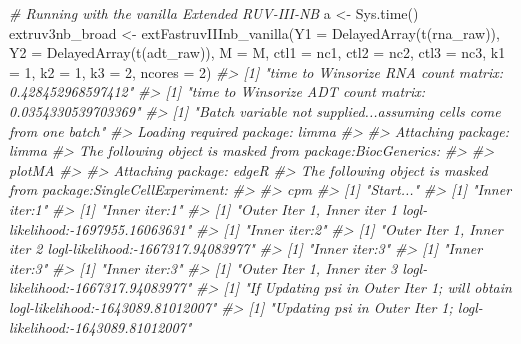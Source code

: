 \documentclass[]{article}
\newcommand{\hlnum}[1]{\textcolor[rgb]{0.816,0.125,0.439}{#1}}%
\newcommand{\hlcom}[1]{\textcolor[rgb]{0.502,0.502,0.502}{\textit{#1}}}%
\newcommand{\hlstd}[1]{\textcolor[rgb]{0.251,0.251,0.251}{#1}}%
\newenvironment{Shaded}{\begin{myshaded}}{\end{myshaded}}
\newcommand{\DecValTok}[1]{\hlnum{#1}}
\newcommand{\CommentTok}[1]{\hlcom{#1}}
\newcommand{\OtherTok}[1]{{#1}}
\newcommand{\FunctionTok}[1]{\hlstd{#1}}
\newcommand{\AttributeTok}[1]{{#1}}
\newcommand{\NormalTok}[1]{\hlstd{#1}}
\begin{document}
\begin{Shaded}
\begin{Highlighting}[]
\CommentTok{\# Running with the vanilla Extended RUV{-}III{-}NB}
\NormalTok{a }\OtherTok{\textless{}{-}} \FunctionTok{Sys.time}\NormalTok{()}
\NormalTok{extruv3nb\_broad }\OtherTok{\textless{}{-}} \FunctionTok{extFastruvIIInb\_vanilla}\NormalTok{(}\AttributeTok{Y1 =} \FunctionTok{DelayedArray}\NormalTok{(}\FunctionTok{t}\NormalTok{(rna\_raw)),}
    \AttributeTok{Y2 =} \FunctionTok{DelayedArray}\NormalTok{(}\FunctionTok{t}\NormalTok{(adt\_raw)), }\AttributeTok{M =}\NormalTok{ M, }\AttributeTok{ctl1 =}\NormalTok{ nc1, }\AttributeTok{ctl2 =}\NormalTok{ nc2,}
    \AttributeTok{ctl3 =}\NormalTok{ nc3, }\AttributeTok{k1 =} \DecValTok{1}\NormalTok{, }\AttributeTok{k2 =} \DecValTok{1}\NormalTok{, }\AttributeTok{k3 =} \DecValTok{2}\NormalTok{, }\AttributeTok{ncores =} \DecValTok{2}\NormalTok{)}
\CommentTok{\#\textgreater{} [1] "time to Winsorize RNA count matrix: 0.428452968597412"}
\CommentTok{\#\textgreater{} [1] "time to Winsorize ADT count matrix: 0.0354330539703369"}
\CommentTok{\#\textgreater{} [1] "Batch variable not supplied...assuming cells come from one batch"}
\CommentTok{\#\textgreater{} Loading required package: limma}
\CommentTok{\#\textgreater{} }
\CommentTok{\#\textgreater{} Attaching package: \textquotesingle{}limma\textquotesingle{}}
\CommentTok{\#\textgreater{} The following object is masked from \textquotesingle{}package:BiocGenerics\textquotesingle{}:}
\CommentTok{\#\textgreater{} }
\CommentTok{\#\textgreater{}     plotMA}
\CommentTok{\#\textgreater{} }
\CommentTok{\#\textgreater{} Attaching package: \textquotesingle{}edgeR\textquotesingle{}}
\CommentTok{\#\textgreater{} The following object is masked from \textquotesingle{}package:SingleCellExperiment\textquotesingle{}:}
\CommentTok{\#\textgreater{} }
\CommentTok{\#\textgreater{}     cpm}
\CommentTok{\#\textgreater{} [1] "Start..."}
\CommentTok{\#\textgreater{} [1] "Inner iter:1"}
\CommentTok{\#\textgreater{} [1] "Inner iter:1"}
\CommentTok{\#\textgreater{} [1] "Outer Iter 1, Inner iter 1 logl{-}likelihood:{-}1697955.16063631"}
\CommentTok{\#\textgreater{} [1] "Inner iter:2"}
\CommentTok{\#\textgreater{} [1] "Outer Iter 1, Inner iter 2 logl{-}likelihood:{-}1667317.94083977"}
\CommentTok{\#\textgreater{} [1] "Inner iter:3"}
\CommentTok{\#\textgreater{} [1] "Inner iter:3"}
\CommentTok{\#\textgreater{} [1] "Inner iter:3"}
\CommentTok{\#\textgreater{} [1] "Outer Iter 1, Inner iter 3 logl{-}likelihood:{-}1667317.94083977"}
\CommentTok{\#\textgreater{} [1] "If Updating psi in Outer Iter 1; will obtain logl{-}likelihood:{-}1643089.81012007"}
\CommentTok{\#\textgreater{} [1] "Updating psi in Outer Iter 1; logl{-}likelihood:{-}1643089.81012007"}

\end{Highlighting}
\end{Shaded}
\end{document}

